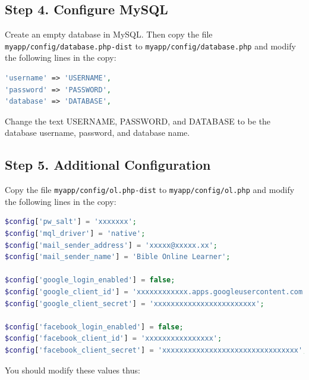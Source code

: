 \documentclass[11pt,oneside,a4paper]{memoir}
\begin{document}
\subsection{Step 4. Configure MySQL}\label{sec-database-php}

Create an empty database in MySQL. Then copy the file
\texttt{myapp/config/database.php-dist} to \texttt{myapp/config/database.php} and modify the
following lines in the copy:

\begin{lstlisting}[language=PHP]
'username' => 'USERNAME',
'password' => 'PASSWORD',
'database' => 'DATABASE',
\end{lstlisting}

Change the text USERNAME, PASSWORD, and DATABASE to be the database username, password, and database
name.


\subsection{Step 5. Additional Configuration}

Copy the file \texttt{myapp/config/ol.php-dist} to \texttt{myapp/config/ol.php} and modify the
following lines in the copy:

\begin{lstlisting}[language=PHP]
$config['pw_salt'] = 'xxxxxxx';
$config['mql_driver'] = 'native';
$config['mail_sender_address'] = 'xxxxx@xxxxx.xx';
$config['mail_sender_name'] = 'Bible Online Learner';

$config['google_login_enabled'] = false;
$config['google_client_id'] = 'xxxxxxxxxxxx.apps.googleusercontent.com';
$config['google_client_secret'] = 'xxxxxxxxxxxxxxxxxxxxxxxx';

$config['facebook_login_enabled'] = false;
$config['facebook_client_id'] = 'xxxxxxxxxxxxxxxx';
$config['facebook_client_secret'] = 'xxxxxxxxxxxxxxxxxxxxxxxxxxxxxxxx';
\end{lstlisting}

You should modify these values thus:
\end{document}
